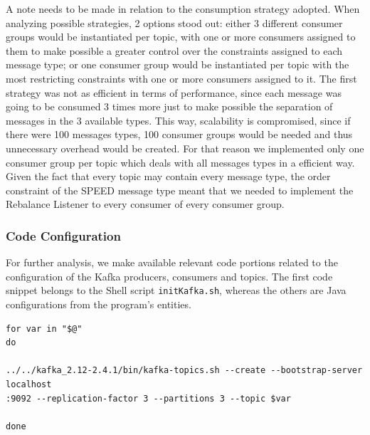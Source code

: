 \documentclass[12pt]{article}
\begin{document}
A note needs to be made in relation to the consumption strategy adopted.
When analyzing possible strategies, 2 options stood out: either 3 different consumer groups would be instantiated per topic, with one or more consumers assigned 
to them to make possible a greater control over the constraints assigned to each message type; or one consumer group would be instantiated per topic with the 
most restricting constraints with one or more consumers assigned to it. 
The first strategy was not as efficient in terms of performance, since each message was going to be consumed 3 times more just to make possible the separation 
of messages in the 3 available types. 
This way, scalability is compromised, since if there were 100 messages types, 100 consumer groups would be needed and thus unnecessary overhead would be created.
For that reason we implemented only one consumer group per topic which deals with all messages types in a efficient way. 
Given the fact that every topic may contain every message type, the order constraint of the SPEED message type meant that we needed to implement the Rebalance 
Listener to every consumer of every consumer group.

\newpage
\subsubsection{Code Configuration}

For further analysis, we make available relevant code portions related to the configuration of the Kafka producers, consumers and topics.
The first code snippet belongs to the Shell script \texttt{initKafka.sh}, whereas the others are Java configurations from the program's entities. 

\vspace{2pt}
\begingroup
  \fontsize{9pt}{10pt}\selectfont
  \begin{verbatim}
for var in "$@"
do

../../kafka_2.12-2.4.1/bin/kafka-topics.sh --create --bootstrap-server localhost
:9092 --replication-factor 3 --partitions 3 --topic $var

done
  \end{verbatim}
\endgroup
\end{document}
